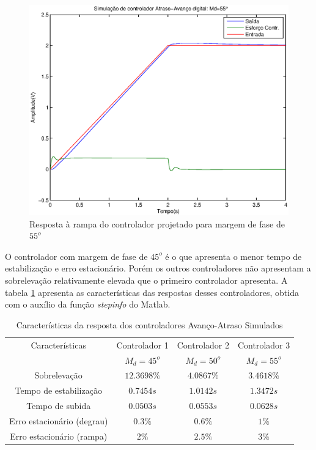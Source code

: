 \documentclass{article}
\begin{document}
\begin{figure}[H]
	\centering
	\includegraphics[width=0.8\linewidth]{yur55r}
	\caption{Resposta à rampa do controlador projetado para margem de fase de $55^o$}
	\label{fig:yru55r}
\end{figure}

O controlador com margem de fase de $45^o$ é o que apresenta o menor tempo de estabilização e erro estacionário. Porém os outros controladores não apresentam a sobrelevação relativamente elevada que o primeiro controlador apresenta. A tabela \ref{tab:avat} apresenta as características das respostas desses controladores, obtida com o auxílio da função \textit{stepinfo} do Matlab.
\begin{table}[H]
	\centering
	\caption{Características da resposta dos controladores Avanço-Atraso Simulados}
	\label{tab:avat}
	\begin{tabular}{|c|c|c|c|}
		\hline Características & Controlador 1& Controlador 2& Controlador 3 \\ 
		&$M_d = 45^o$&$M_d = 50^o$&$M_d = 55^o$\\
		\hline Sobrelevação & $12.3698\%$ & $4.0867\%$ & $3.4618\%$\\ 
		\hline Tempo de estabilização & $0.7454s$ & $1.0142s$ & $1.3472s$\\ 
		\hline Tempo de subida & $0.0503s$ & $0.0553s$ & $0.0628s$\\ 
		\hline Erro estacionário (degrau) & $0.3\%$ & $0.6\%$ & $1\%$\\ 
		\hline Erro estacionário (rampa) & $2\%$ & $2.5\%$ & $3\%$\\ 
		\hline 
	\end{tabular} 
\end{table}
\end{document}
